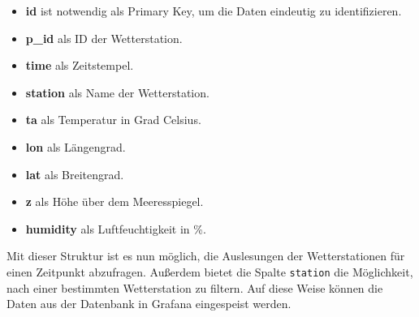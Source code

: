 \begin{itemize}
    \item \textbf{id} ist notwendig als Primary Key, um die Daten eindeutig zu identifizieren.
    \item \textbf{p\_id} als ID der Wetterstation.
    \item \textbf{time} als Zeitstempel.
    \item \textbf{station} als Name der Wetterstation.
    \item \textbf{ta} als Temperatur in Grad Celsius.
    \item \textbf{lon} als Längengrad.
    \item \textbf{lat} als Breitengrad.
    \item \textbf{z} als Höhe über dem Meeresspiegel.
    \item \textbf{humidity} als Luftfeuchtigkeit in \%.
\end{itemize}

Mit dieser Struktur ist es nun möglich, die Auslesungen der Wetterstationen für einen Zeitpunkt abzufragen. Außerdem bietet die Spalte \texttt{station} die Möglichkeit, nach einer bestimmten Wetterstation zu filtern. Auf diese Weise können die Daten aus der Datenbank in Grafana eingespeist werden.

